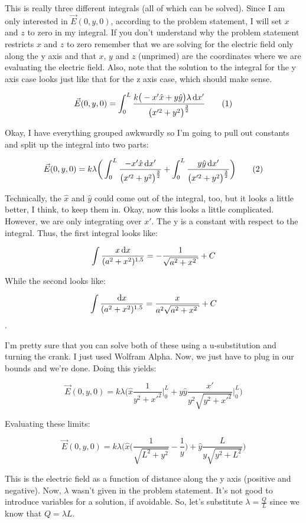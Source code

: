 \begin{homeworkProblem}[Problem 23.42]
This is really three different integrals (all of which can be solved).
Since I am only interested in $\vec{E}(0,y,0)$, according to the problem
statement, I will set $x$ and $z$ to zero in my integral. If you don't
understand why the problem statement restricts $x$ and $z$ to zero
remember that we are solving for the electric field only along the y
axis and that $x$, $y$ and $z$ (unprimed) are the coordinates where we
are evaluating the electric field. Also, note that the solution to the
integral for the y axis case looks just like that for the z axis case,
which should make sense.

\[ \vec{E}(0,y,0) = \int_0^L \frac{k \big(-x'\hat{x}+y\hat{y} \big)
\lambda \diff x'}{\big( x'^2 + y^2\big)^\frac{3}{2}} \addtag \]

Okay, I have everything grouped awkwardly so I'm going to pull out
constants and split up the integral into two parts:

\[ \vec{E}(0,y,0) = k \lambda \bigg( \int_0^L \frac{-x'\hat{x} \diff
x'}{\big( x'^2 + y^2\big)^\frac{3}{2}} + \int_0^L \frac{y\hat{y} \diff
x'}{\big( x'^2 + y^2\big)^\frac{3}{2}} \bigg) \addtag \]

Technically, the $\hat{x}$ and $\hat{y}$ could come out of the integral,
too, but it looks a little better, I think, to keep them in. Okay, now
this looks a little complicated. However, we are only integrating over
$x'$. The y is a constant with respect to the integral. Thus, the first
integral looks like: 

\[ \int \frac{x \diff x}{(a^2+x^2)^{1.5}} = -\frac{1}{\sqrt{a^2+x^2}} +
C \]

While the second looks like:

\[ \int \frac{\diff x}{(a^2 + x^2)^{1.5}} = \frac{x}{a^2\sqrt{a^2+x^2}}
+ C\].

I'm pretty sure that you can solve both of these using a u-substitution
and turning the crank. I just used Wolfram Alpha. Now, we just have to
plug in our bounds and we're done. Doing this yields:


\[ \vec{E}(0,y,0) = k \lambda \bigg( \hat{x} \frac{1}{y^2+x'^2}\Big|_0^L
+ y \hat{y} \frac{x'}{y^2\sqrt{y^2+x'^2}}\Big|_0^L \bigg) \]

Evaluating these limits:

\[ \vec{E}(0,y,0) = k \lambda \bigg( \hat{x} \big( \frac{1}{\sqrt{L^2+
y^2}} - \frac{1}{y } \big) + \hat{y} \frac{L}{y\sqrt{y^2+L^2}} \bigg) \]

This is the electric field as a function of distance along the y axis
(positive and negative). Now, $\lambda$ wasn't given in the problem
statement. It's not good to introduce variables for a solution, if
avoidable. So, let's substitute $\lambda = \frac{Q}{L}$ since we know
that $Q = \lambda L$. 


\end{homeworkProblem}
